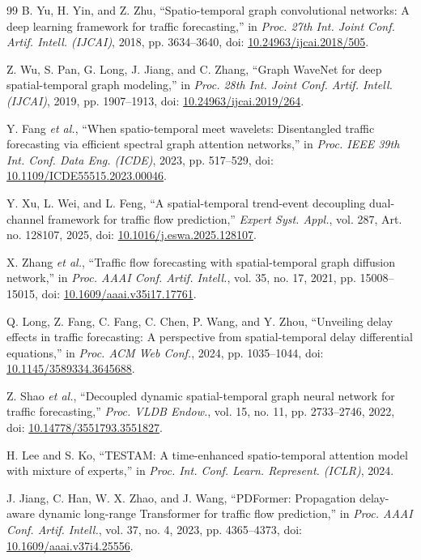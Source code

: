 \begin{thebibliography}{99}
B. Yu, H. Yin, and Z. Zhu, ``Spatio-temporal graph convolutional networks: A deep learning framework for traffic forecasting,'' in \emph{Proc. 27th Int. Joint Conf. Artif. Intell. (IJCAI)}, 2018, pp. 3634--3640, doi: \href{https://doi.org/10.24963/ijcai.2018/505}{10.24963/ijcai.2018/505}.

Z. Wu, S. Pan, G. Long, J. Jiang, and C. Zhang, ``Graph WaveNet for deep spatial-temporal graph modeling,'' in \emph{Proc. 28th Int. Joint Conf. Artif. Intell. (IJCAI)}, 2019, pp. 1907--1913, doi: \href{https://doi.org/10.24963/ijcai.2019/264}{10.24963/ijcai.2019/264}.

Y. Fang \emph{et al.}, ``When spatio-temporal meet wavelets: Disentangled traffic forecasting via efficient spectral graph attention networks,'' in \emph{Proc. IEEE 39th Int. Conf. Data Eng. (ICDE)}, 2023, pp. 517--529, doi: \href{https://doi.org/10.1109/ICDE55515.2023.00046}{10.1109/ICDE55515.2023.00046}.

Y. Xu, L. Wei, and L. Feng, ``A spatial-temporal trend-event decoupling dual-channel framework for traffic flow prediction,'' \emph{Expert Syst. Appl.}, vol. 287, Art. no. 128107, 2025, doi: \href{https://doi.org/10.1016/j.eswa.2025.128107}{10.1016/j.eswa.2025.128107}.

X. Zhang \emph{et al.}, ``Traffic flow forecasting with spatial-temporal graph diffusion network,'' in \emph{Proc. AAAI Conf. Artif. Intell.}, vol. 35, no. 17, 2021, pp. 15008--15015, doi: \href{https://doi.org/10.1609/aaai.v35i17.17761}{10.1609/aaai.v35i17.17761}.

Q. Long, Z. Fang, C. Fang, C. Chen, P. Wang, and Y. Zhou, ``Unveiling delay effects in traffic forecasting: A perspective from spatial-temporal delay differential equations,'' in \emph{Proc. ACM Web Conf.}, 2024, pp. 1035--1044, doi: \href{https://doi.org/10.1145/3589334.3645688}{10.1145/3589334.3645688}.

Z. Shao \emph{et al.}, ``Decoupled dynamic spatial-temporal graph neural network for traffic forecasting,'' \emph{Proc. VLDB Endow.}, vol. 15, no. 11, pp. 2733--2746, 2022, doi: \href{https://doi.org/10.14778/3551793.3551827}{10.14778/3551793.3551827}.

H. Lee and S. Ko, ``TESTAM: A time-enhanced spatio-temporal attention model with mixture of experts,'' in \emph{Proc. Int. Conf. Learn. Represent. (ICLR)}, 2024.

J. Jiang, C. Han, W. X. Zhao, and J. Wang, ``PDFormer: Propagation delay-aware dynamic long-range Transformer for traffic flow prediction,'' in \emph{Proc. AAAI Conf. Artif. Intell.}, vol. 37, no. 4, 2023, pp. 4365--4373, doi: \href{https://doi.org/10.1609/aaai.v37i4.25556}{10.1609/aaai.v37i4.25556}.


\end{thebibliography}
